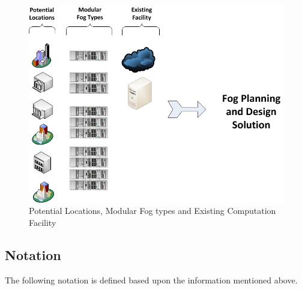 \documentclass[10pt,journal,compsoc]{IEEEtran}
\begin{document}
\begin{figure}
\centerline{\includegraphics[width=4.5in]{existset.png}}
\caption{Potential Locations, Modular Fog types and Existing Computation Facility} 
\label{exist}
\end{figure}
\fi





\subsection{Notation}

The following notation is defined based upon the information mentioned above.
\end{document}
